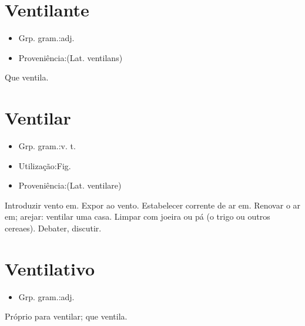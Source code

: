 \documentclass{article}
\begin{document}
\section{Ventilante}
\begin{itemize}
\item {Grp. gram.:adj.}
\end{itemize}
\begin{itemize}
\item {Proveniência:(Lat. \textunderscore ventilans\textunderscore )}
\end{itemize}
Que ventila.
\section{Ventilar}
\begin{itemize}
\item {Grp. gram.:v. t.}
\end{itemize}
\begin{itemize}
\item {Utilização:Fig.}
\end{itemize}
\begin{itemize}
\item {Proveniência:(Lat. \textunderscore ventilare\textunderscore )}
\end{itemize}
Introduzir vento em.
Expor ao vento.
Estabelecer corrente de ar em.
Renovar o ar em; arejar: \textunderscore ventilar uma casa\textunderscore .
Limpar com joeira ou pá (o trigo ou outros cereaes).
Debater, discutir.
\section{Ventilativo}
\begin{itemize}
\item {Grp. gram.:adj.}
\end{itemize}
Próprio para ventilar; que ventila.
\end{document}

